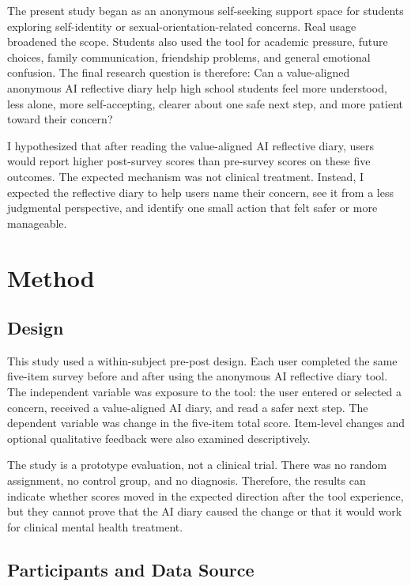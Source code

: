 The present study began as an anonymous self-seeking support space for students exploring self-identity or sexual-orientation-related concerns. Real usage broadened the scope. Students also used the tool for academic pressure, future choices, family communication, friendship problems, and general emotional confusion. The final research question is therefore: Can a value-aligned anonymous AI reflective diary help high school students feel more understood, less alone, more self-accepting, clearer about one safe next step, and more patient toward their concern?

I hypothesized that after reading the value-aligned AI reflective diary, users would report higher post-survey scores than pre-survey scores on these five outcomes. The expected mechanism was not clinical treatment. Instead, I expected the reflective diary to help users name their concern, see it from a less judgmental perspective, and identify one small action that felt safer or more manageable.

\section{Method}

\subsection{Design}

This study used a within-subject pre-post design. Each user completed the same five-item survey before and after using the anonymous AI reflective diary tool. The independent variable was exposure to the tool: the user entered or selected a concern, received a value-aligned AI diary, and read a safer next step. The dependent variable was change in the five-item total score. Item-level changes and optional qualitative feedback were also examined descriptively.

The study is a prototype evaluation, not a clinical trial. There was no random assignment, no control group, and no diagnosis. Therefore, the results can indicate whether scores moved in the expected direction after the tool experience, but they cannot prove that the AI diary caused the change or that it would work for clinical mental health treatment.

\subsection{Participants and Data Source}

